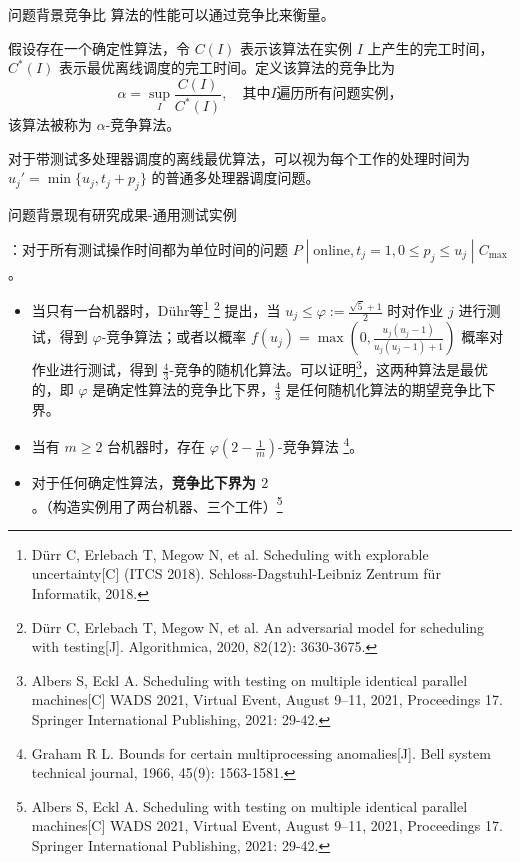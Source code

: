 \begin{frame}{问题背景}{竞争比}
    算法的性能可以通过竞争比来衡量。
    \begin{defi}[竞争比]
        假设存在一个确定性算法，令 $C(I)$ 表示该算法在实例 $I$ 上产生的完工时间，$C^*(I)$ 表示最优离线调度的完工时间。定义该算法的竞争比为
        \[
            \alpha=\sup_{I} \frac{C(I)}{C^*(I)}, \quad \text{其中} I \text{遍历所有问题实例，}
        \]
        该算法被称为 $\alpha$-竞争算法。
    \end{defi}

     对于带测试多处理器调度的离线最优算法，可以视为每个工作的处理时间为 $u_j'= \min\{u_j, t_j + p_j\}$ 的普通多处理器调度问题。
\end{frame}

\begin{frame}{问题背景}{现有研究成果-通用测试实例}

：对于所有测试操作时间都为单位时间的问题 $P\;|\;\text{online}, t_j=1,0\leq p_j \leq u_j\;|\; C_{\text{max}}$。
    \begin{itemize}
        \item 当只有一台机器时，Dühr等\footnote[1]{Dürr C, Erlebach T, Megow N, et al. Scheduling with explorable uncertainty[C] (ITCS 2018). Schloss-Dagstuhl-Leibniz Zentrum für Informatik, 2018.}
\footnote[2]{Dürr C, Erlebach T, Megow N, et al. An adversarial model for scheduling with testing[J]. Algorithmica, 2020, 82(12): 3630-3675.} 提出，当 $u_j \leq \varphi := \frac{\sqrt{5}+1}{2}$ 时对作业 $j$ 进行测试，得到 $\varphi$-竞争算法；或者以概率 $f(u_j) = \max \left(0, \frac{u_j(u_j-1)}{u_j(u_j-1)+1}\right)$ 概率对作业进行测试，得到 $\frac43$-竞争的随机化算法。可以证明\footnote[3]{Albers S, Eckl A. Scheduling with testing on multiple identical parallel machines[C] WADS 2021, Virtual Event, August 9–11, 2021, Proceedings 17. Springer International Publishing, 2021: 29-42.}，这两种算法是最优的，即 $\varphi$ 是确定性算法的竞争比下界，$\frac43$ 是任何随机化算法的期望竞争比下界。

\item 当有 $m\geq 2$ 台机器时，存在 $\varphi(2-\frac1m)$-竞争算法
\footnote[4]{Graham R L. Bounds for certain multiprocessing anomalies[J]. Bell system technical journal, 1966, 45(9): 1563-1581.}。

\item 对于任何确定性算法，\textbf{竞争比下界为 $2$}。（构造实例用了两台机器、三个工件）\footnote[5]{Albers S, Eckl A. Scheduling with testing on multiple identical parallel machines[C] WADS 2021, Virtual Event, August 9–11, 2021, Proceedings 17. Springer International Publishing, 2021: 29-42.} 
    \end{itemize}
    
\end{frame}

